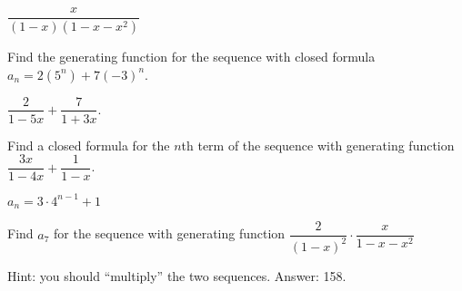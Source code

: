 \begin{questions}
	\begin{answer}
		$\dfrac{x}{(1-x)(1-x-x^2)}$  %
	\end{answer}
	
	
	
	


\question Find the generating function for the sequence with closed formula $a_n = 2(5^n) + 7(-3)^n$.

	\begin{answer}
		$\dfrac{2}{1-5x} + \dfrac{7}{1+3x}$.  %
	\end{answer}
	
	
	
	


\question Find a closed formula for the $n$th term of the sequence with generating function $\dfrac{3x}{1-4x} + \dfrac{1}{1-x}$.

	\begin{answer}
		$a_n = 3\cdot 4^{n-1} + 1$  %
	\end{answer}
	
	
	
	


\question Find $a_7$ for the sequence with generating function $\dfrac{2}{(1-x)^2}\cdot\dfrac{x}{1-x-x^2}$

	\begin{answer}
		Hint: you should ``multiply'' the two sequences.  Answer: 158.  %
	\end{answer}
	





 
\end{questions}



